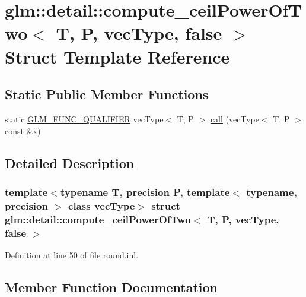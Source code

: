 \hypertarget{structglm_1_1detail_1_1compute__ceil_power_of_two_3_01_t_00_01_p_00_01vec_type_00_01false_01_4}{}\section{glm\+::detail\+::compute\+\_\+ceil\+Power\+Of\+Two$<$ T, P, vec\+Type, false $>$ Struct Template Reference}
\label{structglm_1_1detail_1_1compute__ceil_power_of_two_3_01_t_00_01_p_00_01vec_type_00_01false_01_4}
\subsection*{Static Public Member Functions}
\begin{DoxyCompactItemize}
\item 
static \mbox{\hyperlink{setup_8hpp_a33fdea6f91c5f834105f7415e2a64407}{G\+L\+M\+\_\+\+F\+U\+N\+C\+\_\+\+Q\+U\+A\+L\+I\+F\+I\+ER}} vec\+Type$<$ T, P $>$ \mbox{\hyperlink{structglm_1_1detail_1_1compute__ceil_power_of_two_3_01_t_00_01_p_00_01vec_type_00_01false_01_4_a4b44424366238156e2a2d1b19ace1ad5}{call}} (vec\+Type$<$ T, P $>$ const \&\mbox{\hyperlink{glad_8h_a92d0386e5c19fb81ea88c9f99644ab1d}{x}})
\end{DoxyCompactItemize}


\subsection{Detailed Description}
\subsubsection*{template$<$typename T, precision P, template$<$ typename, precision $>$ class vec\+Type$>$\newline
struct glm\+::detail\+::compute\+\_\+ceil\+Power\+Of\+Two$<$ T, P, vec\+Type, false $>$}



Definition at line 50 of file round.\+inl.



\subsection{Member Function Documentation}
\mbox{\label{structglm_1_1detail_1_1compute__ceil_power_of_two_3_01_t_00_01_p_00_01vec_type_00_01false_01_4_a4b44424366238156e2a2d1b19ace1ad5}} 
